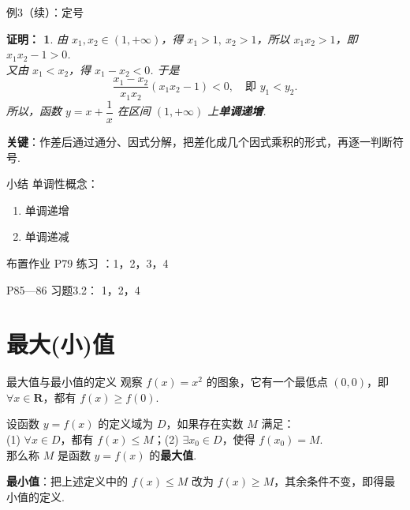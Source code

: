 \documentclass[aspectratio=169,13pt,t] {beamer}
\newtheorem{prooft}{证明：}
\theoremstyle{definition}
\begin{document}
\begin{frame}{例3（续）：定号}
	\begin{prooft}
	由 \(x_1,x_2\in(1,+\infty)\)，得 \(x_1>1,\ x_2>1\)，所以 \(x_1x_2>1\)，即 \(x_1x_2-1>0\).\\
	又由 \(x_1<x_2\)，得 \(x_1-x_2<0\). 于是
	\[
		\frac{x_1-x_2}{x_1x_2}(x_1x_2-1)<0,\quad\text{即 } y_1<y_2.
	\]
	所以，函数 \(y=x+\dfrac{1}{x}\) 在区间 \((1,+\infty)\) 上\textbf{单调递增}.
	\end{prooft}
	\vspace{0.5em}
	\begin{summarybox-answer}
	\textbf{关键}：作差后通过通分、因式分解，把差化成几个因式乘积的形式，再逐一判断符号.
	\end{summarybox-answer}
\end{frame}

\begin{frame}{小结}
	单调性概念：
	\begin{enumerate}[(1)]
		\item<2-> 单调递增
		\item<3-> 单调递减
	\end{enumerate}
\end{frame}

\begin{frame}{布置作业}
	P79 练习 ：1，2，3，4
	
	P85---86 习题3.2： 1，2，4
\end{frame}

\section{最大(小)值}

\begin{frame}{最大值与最小值的定义}
	观察 \(f(x)=x^2\) 的图象，它有一个最低点 \((0,0)\)，即 \(\forall x\in\mathbf{R}\)，都有 \(f(x)\geqslant f(0)\).
	\begin{summarybox}[最大值]
	设函数 \(y=f(x)\) 的定义域为 \(D\)，如果存在实数 \(M\) 满足：\\
	(1) \(\forall x\in D\)，都有 \(f(x)\leqslant M\)；\quad (2) \(\exists x_0\in D\)，使得 \(f(x_0)=M\).\\
	那么称 \(M\) 是函数 \(y=f(x)\) 的\textbf{最大值}.
	\end{summarybox}
	\begin{summarybox-answer}
	\textbf{最小值}：把上述定义中的 \(f(x)\leqslant M\) 改为 \(f(x)\geqslant M\)，其余条件不变，即得最小值的定义.
	\end{summarybox-answer}
\end{frame}
\end{document}
